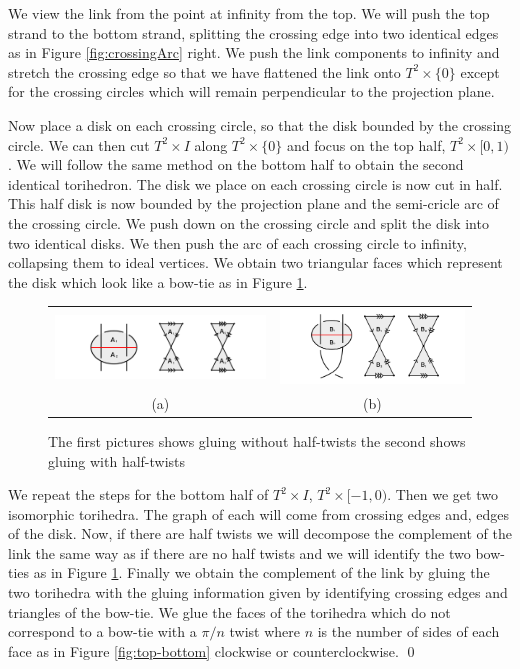\documentclass[11pt]{amsart}
\theoremstyle{plain}
\theoremstyle{definition}
\begin{document}
\indent We view the link from the point at infinity from the top. We will push the top strand to the bottom strand, splitting the crossing edge into two identical edges as in Figure \ref{fig:crossingArc} right. We push the link components to infinity and stretch the crossing edge so that we have flattened the link onto $T^2 \times \{0\}$ except for the crossing circles which will remain perpendicular to the projection plane. 
 
\indent Now place a disk on each crossing circle, so that the disk bounded by the crossing circle. We can then cut $T^2 \times I$ along $T^2 \times \{0\}$ and focus on the top half, $T^2 \times [0,1)$. We will follow the same method on the bottom half to obtain the second identical torihedron. The disk we place on each crossing circle is now cut in half. This half disk is now bounded by the projection plane and the semi-cricle arc of the crossing circle. We push down on the crossing circle and split the disk into two identical disks. We then push the arc of each crossing circle to infinity, collapsing them to ideal vertices. We obtain two triangular faces which represent the disk which look like a bow-tie as in Figure \ref{fig:falGluings}. 

\begin{figure}
 \centering
 \begin{tabular}{cc}
 \includegraphics [width=8cm]{falGluing1}&
 \includegraphics [width=7cm]{falGluing2}\\
 (a)&(b)
 \end{tabular}
 \caption{The first pictures shows gluing without half-twists the second shows gluing with half-twists}
 \label{fig:falGluings}
 \end{figure}

\indent We repeat the steps for the bottom half of $T^2 \times I$, $T^2 \times
[-1,0)$. Then we get two isomorphic torihedra. The graph of each will come from
crossing edges and, edges of the disk. Now, if there are half twists we will
decompose the complement of the link the same way as if there are no half twists
and we will identify the two bow-ties as in Figure \ref{fig:falGluings}. Finally
we obtain the complement of the link by gluing the two torihedra with the gluing
information given by identifying crossing edges and triangles of the bow-tie. We
glue the faces of the torihedra which do not correspond to a bow-tie with a
$\pi/n$ twist where $n$ is the number of sides of each face as in Figure
\ref{fig:top-bottom} clockwise or counterclockwise. \qed
\end{document}
